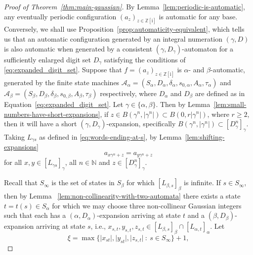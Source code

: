 \documentclass{amsart}
\newcommand{\N}{\mathbb{N}}
\newcommand{\Z}{\mathbb{Z}}
\newcommand{\tcb}{\textcolor{blue}}
\newcommand{\ii}{\mathrm{i}}
\newtheorem*{main theorem}{Theorem \ref{thm:main-gaussian}}
\theoremstyle{definition}
\begin{document}
\begin{proof}[Proof of Theorem~\ref{thm:main-gaussian}] By Lemma~\ref{lem:periodic-is-automatic}, 
    any eventually periodic configuration $(a_z)_{z\in \Z[\ii]}$ is automatic for any base.    
    Conversely, we shall use Proposition~\ref{prop:automaticity-equivalent}, which tells us that an automatic configuration generated by an integral numeration $(\gamma, D)$ is also automatic when generated by a consistent $(\gamma, D_\gamma)$-automaton for a sufficiently enlarged digit set $D_\gamma$ satisfying the conditions of \eqref{eq:expanded_digit_set}. Suppose that $f=(a_z)_{z\in \Z[\ii]}$ is  $\alpha$- and $\beta$-automatic, generated by the finite state machines $\mathcal{A_\alpha}=(S_\alpha,D_\alpha,\delta_\alpha,s_{0,\alpha},A_\alpha,\tau_{\alpha})$ and $\mathcal{A_\beta}=(S_\beta,D_\beta,\delta_\beta,s_{0,\beta},A_{\beta},\tau_{\beta})$ respectively, where $D_\alpha$ and $D_\beta $ are defined as in Equation~\eqref{eq:expanded_digit_set}. 
     Let $\gamma\in \{\alpha, \beta\}$.
     Then by Lemma~\ref{lem:small-numbers-have-short-expansions}, if $z\in B(\gamma^n, |\gamma^n|)\subset  B(0, r|\gamma^n|)$, where $r\geq 2$,  then it will have a short $(\gamma, D_\gamma)$-expansion, specifically  $B(\gamma^n, |\gamma^n|)\subset [D_\gamma^n]_\gamma$. Taking $L_{\gamma s}$ as defined in \eqref{eq:words-ending-at-s}, by Lemma~\ref{lem:shifting-expansions}
        \[a_{x\gamma^n+z} = a_{y\gamma^n+z}\]
    for all $x, y \in [L_{\gamma s}]_\gamma$, all $n \in \N$ and $z \in [D^n_\gamma]_\gamma$.

Recall that  $S_\infty$ is the set of states in $S_\beta$ for which $[L_{\beta, s}]_\beta$ is infinite. If $s\in S_\infty$,
then by Lemma ~\ref{lem:non-collinearity-with-two-automata}
 there exists a state $t=t(s)\in S_\alpha$ for which we may choose three non-collinear Gaussian integers 
 such that each has a $(\alpha, D_\alpha)$-expansion arriving at state $t$ and a $(\beta, D_\beta)$-expansion arriving at state $s$, i.e., 
 $x_{s,t},y_{s,t},z_{s,t}\in [L_{\beta,s}]_\beta\cap [L_{\alpha,t}]_\alpha$. 
 Let
 \[\xi = \max\{\lvert x_{st}\rvert , \lvert y_{st}\rvert, \lvert z_{s,t}\rvert \::\: s \in S_\infty\} + 1,\] %






\end{proof}
\end{document}
